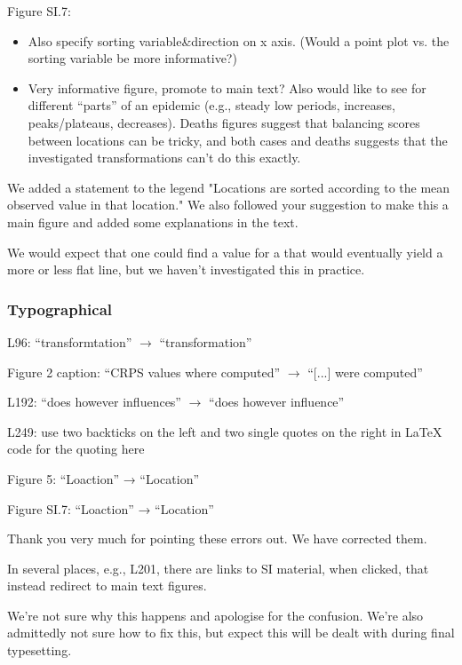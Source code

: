 \documentclass{article}
\newcommand{\black}{\color{black}}
\newcommand{\blue}{\color{blue}}
\newcommand{\notindented}{\setlength{\leftskip}{0cm}}
\begin{document}
\notindented

\blue
Figure SI.7:
\begin{itemize}
    \item Also specify sorting variable\&direction on x axis. (Would a point plot vs. the sorting variable be more informative?)
    \item Very informative figure, promote to main text? Also would like to see for different “parts” of an epidemic (e.g., steady low periods, increases, peaks/plateaus, decreases). Deaths figures suggest that balancing scores between locations can be tricky, and both cases and deaths suggests that the investigated transformations can’t do this exactly.
\end{itemize}

\black
We added a statement to the legend "Locations are sorted according to the mean observed value in that location." We also followed your suggestion to make this a main figure and added some explanations in the text. 

We would expect that one could find a value for a that would eventually yield a more or less flat line, but we haven't investigated this in practice. 

\blue
\subsubsection{Typographical}
\blue
L96: “transformtation” $\xrightarrow{}$ “transformation”

Figure 2 caption: “CRPS values where computed” $\xrightarrow{}$ “[...] were computed”

L192: “does however influences” $\xrightarrow{}$ “does however influence”

L249: use two backticks on the left and two single quotes on the right in LaTeX code for the quoting here

Figure 5: “Loaction” → “Location”

Figure SI.7: “Loaction” → “Location”

\black
Thank you very much for pointing these errors out. We have corrected them. 


\blue
In several places, e.g., L201, there are links to SI material, when clicked, that instead redirect to main text figures.

\black
We're not sure why this happens and apologise for the confusion. We're also admittedly not sure how to fix this, but expect this will be dealt with during final typesetting. 
\end{document}
